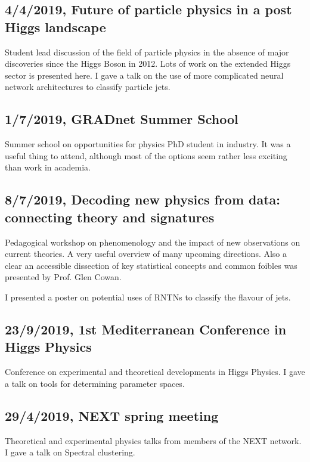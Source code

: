  \tocless\subsection{4/4/2019, Future of particle physics in a post Higgs landscape}
 Student lead discussion of the field of particle physics in the absence of major discoveries since the Higgs Boson in 2012.
 Lots of work on the extended Higgs sector is presented here.
 I gave a talk on the use of more complicated neural network architectures to classify particle jets.

 \tocless\subsection{1/7/2019, GRADnet Summer School}
 Summer school on opportunities for physics PhD student in industry.
 It was a useful thing to attend, although most of the options seem rather less exciting than work in academia.

 \tocless\subsection{8/7/2019, Decoding new physics from data: connecting theory and signatures}
 Pedagogical workshop on phenomenology and the impact of new observations on current theories. 
 A very useful overview of many upcoming directions.
 Also a clear an accessible dissection of key statistical concepts and common foibles was presented by Prof. Glen Cowan.

 I presented a poster on potential uses of RNTNs to classify the flavour of jets.

 \tocless\subsection{23/9/2019, 1st Mediterranean Conference in Higgs Physics}
 Conference on experimental and theoretical developments in Higgs Physics.
 I gave a talk on tools for determining parameter spaces.

 \tocless\subsection{29/4/2019, NEXT spring meeting}
 Theoretical and experimental physics talks from members of the NEXT network.
 I gave a talk on Spectral clustering.
